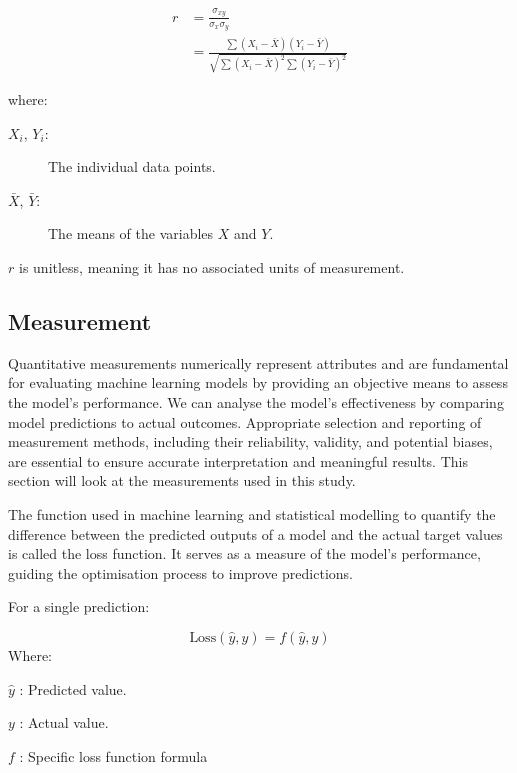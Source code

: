 \begin{itemize}
\begin{itemize}
			
			\begin{align*}
				r &= \frac{\sigma_{xy}}{\sigma_x\sigma_y}\\
				  &= \frac{\sum (X_i - \bar{X})(Y_i - \bar{Y}) }{\sqrt{\sum (X_i - \bar{X})^2 \sum (Y_i - \bar{Y})^2}}
			\end{align*}
			
			
			
			where:
			\begin{description}
				\item[$X_i$, $Y_i$:] The individual data points.
				\item[$\bar{X}$, $\bar{Y}$:] The means of the variables $X$ and $Y$.
			\end{description}
			
			$r$ is unitless, meaning it has no associated units of measurement.
			
			
		\end{itemize}
	\end{itemize}
	
	
	
	
	
	\subsection{Measurement}
	
		Quantitative measurements\cite{james2013introduction} numerically represent attributes and are fundamental for evaluating machine learning models by providing an objective means to assess the model's performance. We can analyse the model's effectiveness by comparing model predictions to actual outcomes. Appropriate selection and reporting of measurement methods, including their reliability, validity, and potential biases, are essential to ensure accurate interpretation and meaningful results. This section will look at the measurements used in this study.
		
		The function used in machine learning and statistical modelling to quantify the difference between the predicted outputs of a model and the actual target values is called the loss function. It serves as a measure of the model's performance, guiding the optimisation process to improve predictions.
		
		For a single prediction:
		
		$$\text{Loss}(\hat{y}, y) = f(\hat{y}, y)$$
		Where:
		
		
		\begin{compactitem}
			\item [$\hat{y}$]: Predicted value.
			\item [$y$]: Actual value.
			\item [$f$]: Specific loss function formula
		\end{compactitem}
		
